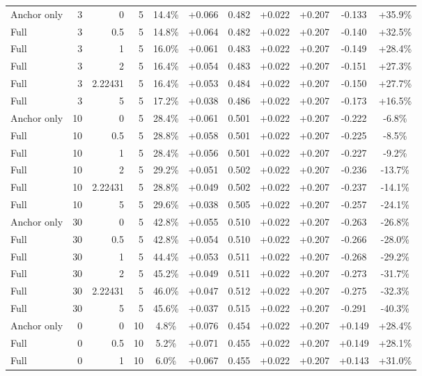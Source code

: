 \begin{table}[htbp]
\begin{tabular}{lrrrccccccc}
Anchor only & 3 & 0 & 5 & 14.4\% & +0.066 & 0.482 & +0.022 & +0.207 & -0.133 & +35.9\% \\
Full & 3 & 0.5 & 5 & 14.8\% & +0.064 & 0.482 & +0.022 & +0.207 & -0.140 & +32.5\% \\
Full & 3 & 1 & 5 & 16.0\% & +0.061 & 0.483 & +0.022 & +0.207 & -0.149 & +28.4\% \\
Full & 3 & 2 & 5 & 16.4\% & +0.054 & 0.483 & +0.022 & +0.207 & -0.151 & +27.3\% \\
Full & 3 & 2.22431 & 5 & 16.4\% & +0.053 & 0.484 & +0.022 & +0.207 & -0.150 & +27.7\% \\
Full & 3 & 5 & 5 & 17.2\% & +0.038 & 0.486 & +0.022 & +0.207 & -0.173 & +16.5\% \\
Anchor only & 10 & 0 & 5 & 28.4\% & +0.061 & 0.501 & +0.022 & +0.207 & -0.222 & -6.8\% \\
Full & 10 & 0.5 & 5 & 28.8\% & +0.058 & 0.501 & +0.022 & +0.207 & -0.225 & -8.5\% \\
Full & 10 & 1 & 5 & 28.4\% & +0.056 & 0.501 & +0.022 & +0.207 & -0.227 & -9.2\% \\
Full & 10 & 2 & 5 & 29.2\% & +0.051 & 0.502 & +0.022 & +0.207 & -0.236 & -13.7\% \\
Full & 10 & 2.22431 & 5 & 28.8\% & +0.049 & 0.502 & +0.022 & +0.207 & -0.237 & -14.1\% \\
Full & 10 & 5 & 5 & 29.6\% & +0.038 & 0.505 & +0.022 & +0.207 & -0.257 & -24.1\% \\
Anchor only & 30 & 0 & 5 & 42.8\% & +0.055 & 0.510 & +0.022 & +0.207 & -0.263 & -26.8\% \\
Full & 30 & 0.5 & 5 & 42.8\% & +0.054 & 0.510 & +0.022 & +0.207 & -0.266 & -28.0\% \\
Full & 30 & 1 & 5 & 44.4\% & +0.053 & 0.511 & +0.022 & +0.207 & -0.268 & -29.2\% \\
Full & 30 & 2 & 5 & 45.2\% & +0.049 & 0.511 & +0.022 & +0.207 & -0.273 & -31.7\% \\
Full & 30 & 2.22431 & 5 & 46.0\% & +0.047 & 0.512 & +0.022 & +0.207 & -0.275 & -32.3\% \\
Full & 30 & 5 & 5 & 45.6\% & +0.037 & 0.515 & +0.022 & +0.207 & -0.291 & -40.3\% \\
Anchor only & 0 & 0 & 10 & 4.8\% & +0.076 & 0.454 & +0.022 & +0.207 & +0.149 & +28.4\% \\
Full & 0 & 0.5 & 10 & 5.2\% & +0.071 & 0.455 & +0.022 & +0.207 & +0.149 & +28.1\% \\
Full & 0 & 1 & 10 & 6.0\% & +0.067 & 0.455 & +0.022 & +0.207 & +0.143 & +31.0\% \\

\end{tabular}
\end{table}
